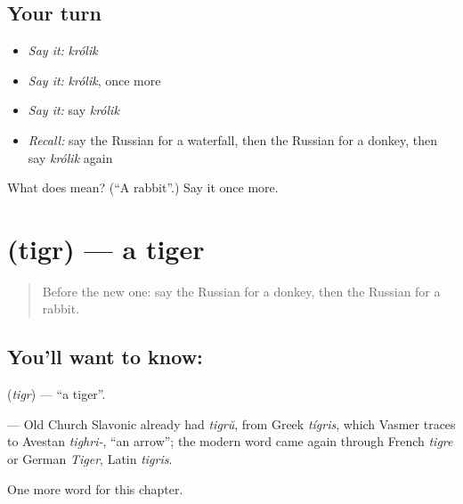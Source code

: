 \subsection*{Your turn}
\begin{itemize}
\raggedright
  \item \emph{Say it:} \emph{królik}
  \item \emph{Say it:} \emph{królik}, once more
  \item \emph{Say it:} say \emph{królik}
  \item \emph{Recall:} say the Russian for a waterfall, then the Russian for a donkey, then say \emph{królik} again
\end{itemize}

\begin{tcolorbox}[breakable,colback=teal!4,colframe=teal!35!black,title={Before you move on}]
What does  mean? (\textquotedblleft{}A rabbit\textquotedblright{}.) Say it once more.
\end{tcolorbox}
\section[\texorpdfstring{\ru{тигр} (tigr)}{тигр (tigr)}]{ (tigr) — a tiger}

\label{lesson:RU-C117-tiger}



\begin{quote}
Before the new one: say the Russian for a donkey, then the Russian for a rabbit.
\end{quote}

\subsection*{You'll want to know: }
\textbf{} (\emph{tigr}) — \textquotedblleft{}a tiger\textquotedblright{}.

\begin{cousinweb}
\textbf{} — Old Church Slavonic already had \emph{tigrŭ}, from Greek \emph{tígris}, which Vasmer traces to Avestan \emph{tighri-}, \textquotedblleft{}an arrow\textquotedblright{}; the modern word came again through French \emph{tigre} or German \emph{Tiger}, Latin \emph{tigris}.
\end{cousinweb}

\begin{grammarlens}[title={What you've built}]
One more word for this chapter.
\end{grammarlens}

